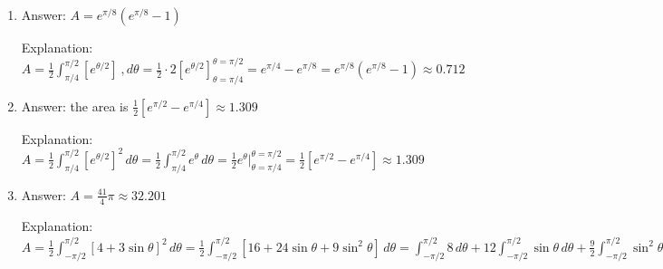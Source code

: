 \begin{Answer}[ref = polar4]
\begin{enumerate}
\item Answer: $A = e^{\pi/8} \left( e^{\pi/8} - 1 \right)$

Explanation: $A = \frac{1}{2} \int_{\pi/4}^{\pi/2} \left[ e^{\theta/2} \right]\
,d\theta = \frac{1}{2} \cdot 2 \left[e^{\theta/2} \right]_{\theta = \pi/4}^{
\theta = \pi/2} = e^{\pi/4} - e^{\pi/8} = e^{\pi/8} \left( e^{\pi/8} - 1 
\right) \approx 0.712$

\item Answer: the area is $\frac{1}{2} \left[ e^{\pi/2} - e^{\pi/4} \right] 
\approx 1.309$

Explanation: $A = \frac{1}{2} \int_{\pi/4}^{\pi/2} \left[ e^{\theta/2} \right]^
2 \,d\theta = \frac{1}{2} \int_{\pi/4}^{\pi/2} e^{\theta}\,d\theta = \frac{1}{2
} e^{\theta}|_{\theta = \pi/4}^{\theta = \pi/2} = \frac{1}{2} \left[ e^{\pi/2} 
- e^{\pi/4} \right] \approx 1.309$

\item Answer: $A = \frac{41}{4} \pi \approx 32.201$

Explanation: $A = \frac{1}{2} \int_{-\pi/2} ^ {\pi/2} \left[4 + 3\sin{\theta} 
\right]^2\,d\theta = \frac{1}{2} \int_{-\pi/2}^{\pi/2} \left[ 16 + 24\sin{
\theta} + 9\sin^2{\theta} \right]\,d\theta = \int_{-\pi/2}^{\pi/2} 8\,d\theta 
+ 12 \int_{-\pi/2}^{\pi/2} \sin{\theta}\,d\theta + \frac{9}{2} \int_{-\pi/2}^{
\pi/2} \sin^2{\theta}\,d\theta = \left[ 8 \theta \right]_{\theta = -\pi/2}^{
\theta = \pi/2} + 12 \left[ -\cos{\theta} \right]_{\theta = -\pi/2}^{\theta = 
\pi/2} + \frac{9}{2} \int_{-\pi/2}^{\pi/2} \frac{1 - \cos{2\theta}}{2}\,d\theta
= 8 \left[ \left(\frac{\pi}{2} \right) - \left( \frac{-\pi}{2} \right) \right] 
+ 12 \left[ \left(-\cos{\frac{\pi}{2}} \right) - \left( -\cos{\frac{-\pi}{2}} 
\right) \right] + \frac{9}{4} \int_{-\pi/2}^{\pi/2} 1\,d\theta - \frac{9}{4} 
\int_{-\pi/2}^{\pi/2} \cos{2\theta}\,d\theta = 8\pi + 12 \left(0 - 0 \right) + 
\frac{9}{4} \left[ \theta \right]_{\theta = -\pi/2}^{\theta = \pi/2} - \frac{9
}{4} \left[ \frac{1}{2} \sin{2\theta} \right]_{\theta = -\pi/2}^{\theta = \pi/
2} = 8\pi + \frac{9}{4} \left[ \left( \frac{\pi}{2} \right) - \left( - \frac{
\pi}{2} \right) \right] - \frac{9}{8} \left[ \sin{ \left( 2 \cdot \frac{\pi}{2}
\right)} - \sin{\left( 2 \cdot -\frac{\pi}{2} \right)} \right] = 8\pi + \frac{9
}{4} \pi - \frac{9}{8} \left[ \sin{\left( \pi \right)} - \sin{ \left( -\pi 
\right)} \right] = \frac{41}{4} \pi - \frac{9}{8} \left[ 0 - \left( -0 \right) 
\right] = \frac{41}{4}\pi \approx 32.201$
\end{enumerate}
\end{Answer}

